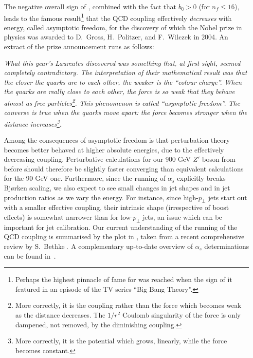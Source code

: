 %
The negative overall sign of , combined with the fact
that $b_0 > 0$ (for $n_f \le 16$), leads to the famous
result\footnote{
Perhaps the highest pinnacle of fame for  was reached
when the sign of it featured in an episode of the TV series ``Big Bang
Theory''.} 
that the QCD coupling effectively \emph{decreases} with
 energy, called asymptotic 
freedom, for the discovery of which the Nobel prize in physics was
awarded to D.~Gross, H.~Politzer, and F.~Wilczek in 2004. An extract
of the prize announcement runs as follows:
\begin{center}
\begin{minipage}{0.84\textwidth}
\sl  What this year's Laureates discovered was something that, at
first sight, seemed completely contradictory. The interpretation of
their mathematical result was that the closer the quarks are to each
other, the \emph{weaker} is the ``colour charge''. When the quarks are
really close to each other, the force is so weak that they behave
almost as free particles\footnote{More correctly, it is the coupling
  rather than the  
  force which becomes weak as the distance decreases. 
  The $1/r^2$ Coulomb singularity of the force is only dampened, not removed, 
  by the diminishing coupling.}. 
This phenomenon is called ``asymptotic
freedom''. The converse is true when the quarks move apart: the force
becomes stronger when the distance increases\footnote{More correctly,
 it is the potential which grows, linearly, while the force becomes
 constant.}. 
\end{minipage}
\end{center}

%
%
Among the consequences of asymptotic freedom is that perturbation
theory becomes better behaved at higher absolute energies, due to the
effectively decreasing coupling. Perturbative calculations for our
900-GeV $Z'$ boson from before should therefore be slightly faster
converging than equivalent calculations for the 90-GeV one. 
Furthermore, since the running of  $\alpha_s$ explicitly
breaks Bj{\o}rken scaling, we also expect to see small changes in jet
shapes and in jet production ratios as we vary the energy. For
instance, since high-$p_\perp$ jets
start out with a smaller effective coupling, their intrinsic shape
(irrespective of boost effects) is
somewhat narrower than for low-$p_\perp$ jets, an issue which can be
important for jet calibration. Our current understanding of the
running of the QCD coupling is summarised by the plot in
, taken from a recent comprehensive review by S.\ Bethke
\cite{pdg2012,Bethke:2012jm}. A complementary up-to-date overview of
$\alpha_s$ determinations can be found in~\cite{d'Enterria:2015toz}. 

